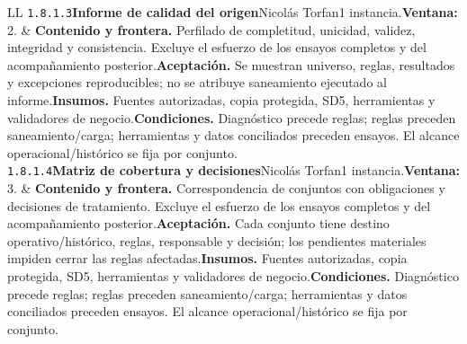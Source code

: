 \begin{longtable}{L{\tabcolsep\relax}L{\tabcolsep\relax}}
\texttt{1.\allowbreak{}8.\allowbreak{}1.\allowbreak{}3}\newline{}\textbf{Informe de calidad del origen}\newline{}Nicolás Torfan\newline{}1 instancia.\newline{}\textbf{Ventana:} 2. & \textbf{Contenido y frontera.} Perfilado de completitud, unicidad, validez, integridad y consistencia. Excluye el esfuerzo de los ensayos completos y del acompañamiento posterior.\newline{}\textbf{Aceptación.} Se muestran universo, reglas, resultados y excepciones reproducibles; no se atribuye saneamiento ejecutado al informe.\newline{}\textbf{Insumos.} Fuentes autorizadas, copia protegida, SD5, herramientas y validadores de negocio.\newline{}\textbf{Condiciones.} Diagnóstico precede reglas; reglas preceden saneamiento/carga; herramientas y datos conciliados preceden ensayos. El alcance operacional/histórico se fija por conjunto.\\\hline
\texttt{1.\allowbreak{}8.\allowbreak{}1.\allowbreak{}4}\newline{}\textbf{Matriz de cobertura y decisiones}\newline{}Nicolás Torfan\newline{}1 instancia.\newline{}\textbf{Ventana:} 3. & \textbf{Contenido y frontera.} Correspondencia de conjuntos con obligaciones y decisiones de tratamiento. Excluye el esfuerzo de los ensayos completos y del acompañamiento posterior.\newline{}\textbf{Aceptación.} Cada conjunto tiene destino operativo/histórico, reglas, responsable y decisión; los pendientes materiales impiden cerrar las reglas afectadas.\newline{}\textbf{Insumos.} Fuentes autorizadas, copia protegida, SD5, herramientas y validadores de negocio.\newline{}\textbf{Condiciones.} Diagnóstico precede reglas; reglas preceden saneamiento/carga; herramientas y datos conciliados preceden ensayos. El alcance operacional/histórico se fija por conjunto.\\\hline

\end{longtable}
